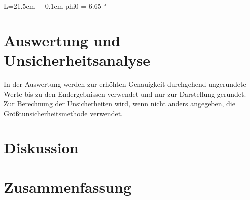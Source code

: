 \documentclass[12pt,a4paper,twoside]{article}
\begin{document}
L=21.5cm +-0.1cm
phi0 = 6.65 °



\section{Auswertung und Unsicherheitsanalyse} %

In der Auswertung werden zur erhöhten Genauigkeit durchgehend ungerundete Werte bis zu den Endergebnissen verwendet und nur zur Darstellung gerundet. \\
Zur Berechnung der Unsicherheiten wird, wenn nicht anders angegeben, die Größtunsicherheitsmethode verwendet.


\section{Diskussion} %


\section{Zusammenfassung} %


\printbibliography[heading=bibintoc]
\end{document}
